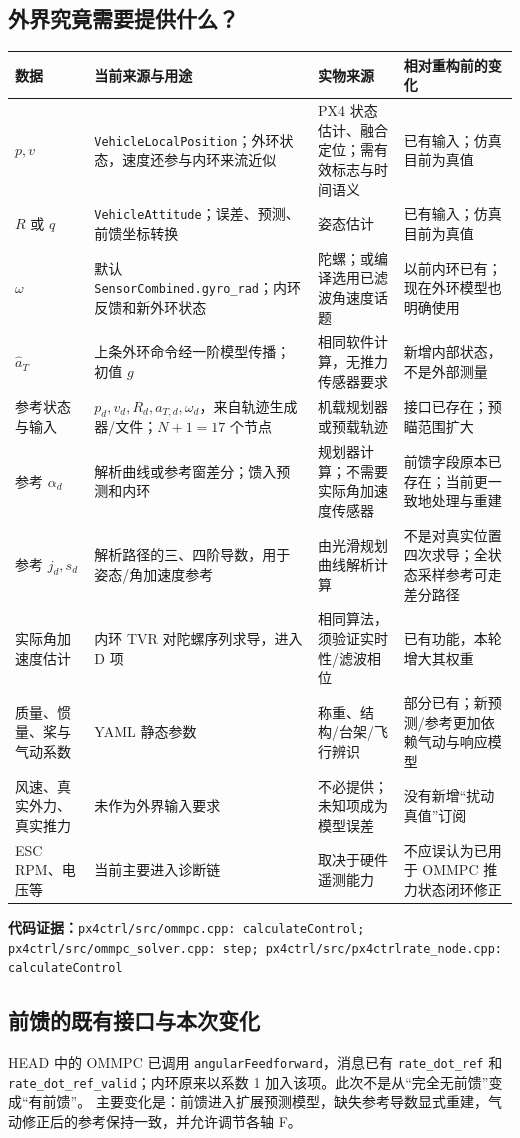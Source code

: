 \documentclass[UTF8,a4paper,11pt,fontset=fandol]{ctexart}
\newcommand{\code}[1]{{\small\nolinkurl{#1}}}
\newcommand{\source}[1]{\par\noindent\textbf{代码证据：}\code{#1}\par}
\begin{document}
\subsection{外界究竟需要提供什么？}
\begin{longtable}{L{2.3cm}L{4.5cm}L{4.0cm}L{3.9cm}}
\toprule 数据 & 当前来源与用途 & 实物来源 & 相对重构前的变化\\\midrule\endhead
$p,v$ & \code{VehicleLocalPosition}；外环状态，速度还参与内环来流近似 & PX4 状态估计、融合定位；需有效标志与时间语义 & 已有输入；仿真目前为真值\\
$R$ 或 $q$ & \code{VehicleAttitude}；误差、预测、前馈坐标转换 & 姿态估计 & 已有输入；仿真目前为真值\\
$\omega$ & 默认 \code{SensorCombined.gyro_rad}；内环反馈和新外环状态 & 陀螺；或编译选用已滤波角速度话题 & 以前内环已有；现在外环模型也明确使用\\
$\hat a_T$ & 上条外环命令经一阶模型传播；初值 $g$ & 相同软件计算，无推力传感器要求 & 新增内部状态，不是外部测量\\
参考状态与输入 & $p_d,v_d,R_d,a_{T,d},\omega_d$，来自轨迹生成器/文件；$N+1=17$ 个节点 & 机载规划器或预载轨迹 & 接口已存在；预瞄范围扩大\\
参考 $\alpha_d$ & 解析曲线或参考窗差分；馈入预测和内环 & 规划器计算；不需要实际角加速度传感器 & 前馈字段原本已存在；当前更一致地处理与重建\\
参考 $j_d,s_d$ & 解析路径的三、四阶导数，用于姿态/角加速度参考 & 由光滑规划曲线解析计算 & 不是对真实位置四次求导；全状态采样参考可走差分路径\\
实际角加速度估计 & 内环 TVR 对陀螺序列求导，进入 D 项 & 相同算法，须验证实时性/滤波相位 & 已有功能，本轮增大其权重\\
质量、惯量、桨与气动系数 & YAML 静态参数 & 称重、结构/台架/飞行辨识 & 部分已有；新预测/参考更加依赖气动与响应模型\\
风速、真实外力、真实推力 & 未作为外界输入要求 & 不必提供；未知项成为模型误差 & 没有新增“扰动真值”订阅\\
ESC RPM、电压等 & 当前主要进入诊断链 & 取决于硬件遥测能力 & 不应误认为已用于 OMMPC 推力状态闭环修正\\
\bottomrule
\end{longtable}
\source{px4ctrl/src/ommpc.cpp: calculateControl; px4ctrl/src/ommpc_solver.cpp: step; px4ctrl/src/px4ctrlrate_node.cpp: calculateControl}

\subsection{前馈的既有接口与本次变化}
HEAD 中的 OMMPC 已调用 \code{angularFeedforward}，消息已有 \code{rate_dot_ref} 和
\code{rate_dot_ref_valid}；内环原来以系数 1 加入该项。此次不是从“完全无前馈”变成“有前馈”。
主要变化是：前馈进入扩展预测模型，缺失参考导数显式重建，气动修正后的参考保持一致，并允许调节各轴 F。
\end{document}
